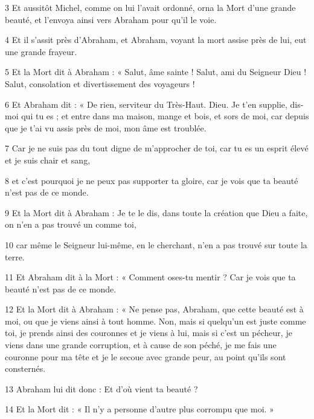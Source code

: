 \par 3 Et aussitôt Michel, comme on lui l'avait ordonné, orna la Mort d'une grande beauté, et l'envoya ainsi vers Abraham pour qu'il le voie.

\par 4 Et il s'assit près d'Abraham, et Abraham, voyant la mort assise près de lui, eut une grande frayeur.

\par 5 Et la Mort dit à Abraham : « Salut, âme sainte ! Salut, ami du Seigneur Dieu ! Salut, consolation et divertissement des voyageurs !

\par 6 Et Abraham dit : « De rien, serviteur du Très-Haut. Dieu. Je t'en supplie, dis-moi qui tu es ; et entre dans ma maison, mange et bois, et sors de moi, car depuis que je t'ai vu assis près de moi, mon âme est troublée.

\par 7 Car je ne suis pas du tout digne de m'approcher de toi, car tu es un esprit élevé et je suis chair et sang,

\par 8 et c'est pourquoi je ne peux pas supporter ta gloire, car je vois que ta beauté n'est pas de ce monde.

\par 9 Et la Mort dit à Abraham : Je te le dis, dans toute la création que Dieu a faite, on n'en a pas trouvé un comme toi,

\par 10 car même le Seigneur lui-même, en le cherchant, n'en a pas trouvé sur toute la terre.

\par 11 Et Abraham dit à la Mort : « Comment oses-tu mentir ? Car je vois que ta beauté n’est pas de ce monde.

\par 12 Et la Mort dit à Abraham : « Ne pense pas, Abraham, que cette beauté est à moi, ou que je viens ainsi à tout homme. Non, mais si quelqu'un est juste comme toi, je prends ainsi des couronnes et je viens à lui, mais si c'est un pécheur, je viens dans une grande corruption, et à cause de son péché, je me fais une couronne pour ma tête et je le secoue avec grande peur, au point qu’ils sont consternés.

\par 13 Abraham lui dit donc : Et d'où vient ta beauté ?

\par 14 Et la Mort dit : « Il n'y a personne d'autre plus corrompu que moi. »


